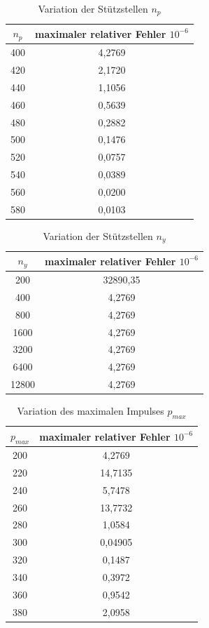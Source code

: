 \documentclass[11pt,a4paper]{article}
\begin{document}
\begin{table}[htbp]
	\begin{center}
	\begin{tabular}{c|c}
		$n_p$ & maximaler relativer Fehler $10^{-6}$\\ \hline
		400 & 4,2769 \\
		420 & 2,1720 \\
		440 & 1,1056 \\
		460 & 0,5639 \\
		480 & 0,2882 \\
		500 & 0,1476 \\
		520 & 0,0757 \\
		540 & 0,0389 \\
		560 & 0,0200 \\
		580 & 0,0103
	\end{tabular}
	\end{center}
	
	\label{tab:variation_np}\caption{Variation der Stützstellen $n_p$}
\end{table}
\begin{table}[htbp]
	\begin{center}
	\begin{tabular}{c|c}
		$n_y$ & maximaler relativer Fehler $10^{-6}$ \\ \hline
		200 & 32890,35 \\
		400 & 4,2769 \\
		800 & 4,2769 \\
		1600 & 4,2769 \\
		3200 & 4,2769 \\
		6400 & 4,2769 \\
		12800 & 4,2769
	\end{tabular}
\end{center}
\label{tab:variation_ny}\caption{Variation der Stützstellen $n_y$}
\end{table}
\begin{table}[btbp]
	\begin{center}
	\begin{tabular}{c|c}
		$p_{max} $ & maximaler relativer Fehler $10^{-6}$ \\ \hline
		200 & 4,2769 \\
		220 & 14,7135 \\
		240 & 5,7478 \\
		260 & 13,7732 \\
		280 & 1,0584 \\
		300 & 0,04905 \\
		320 & 0,1487 \\
		340 & 0,3972 \\
		360 & 0,9542 \\
		380 & 2,0958
	\end{tabular}
\end{center}
\label{tab_variation_pmax}\caption{Variation des maximalen Impulses $p_{max}$}
\end{table}
\end{document}
